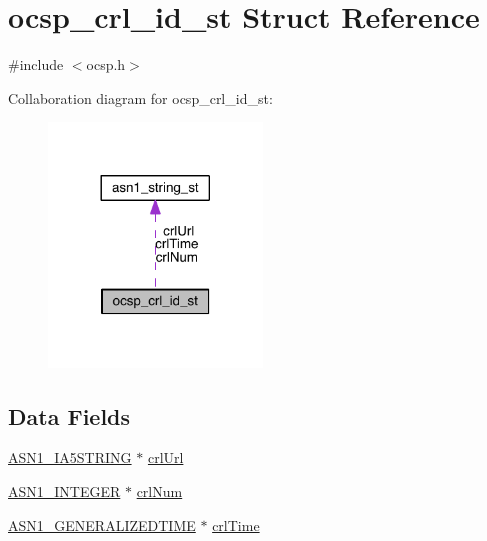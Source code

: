 \hypertarget{structocsp__crl__id__st}{}\section{ocsp\+\_\+crl\+\_\+id\+\_\+st Struct Reference}
\label{structocsp__crl__id__st}


{\ttfamily \#include $<$ocsp.\+h$>$}



Collaboration diagram for ocsp\+\_\+crl\+\_\+id\+\_\+st\+:\nopagebreak
\begin{figure}[H]
\begin{center}
\leavevmode
\includegraphics[width=161pt]{structocsp__crl__id__st__coll__graph}
\end{center}
\end{figure}
\subsection*{Data Fields}
\begin{DoxyCompactItemize}
\item 
\hyperlink{crypto_2ossl__typ_8h_a0d915c339a64c1c9871d5404e51c44fd}{A\+S\+N1\+\_\+\+I\+A5\+S\+T\+R\+I\+NG} $\ast$ \hyperlink{structocsp__crl__id__st_aa6926655bdd63112ca018d51fb103297}{crl\+Url}
\item 
\hyperlink{crypto_2ossl__typ_8h_af4335399bf9774cb410a5e93de65998b}{A\+S\+N1\+\_\+\+I\+N\+T\+E\+G\+ER} $\ast$ \hyperlink{structocsp__crl__id__st_ae6ffaabc958161934fbecacda433785e}{crl\+Num}
\item 
\hyperlink{crypto_2ossl__typ_8h_abd19ea5b527807ce3a516e6a41440f84}{A\+S\+N1\+\_\+\+G\+E\+N\+E\+R\+A\+L\+I\+Z\+E\+D\+T\+I\+ME} $\ast$ \hyperlink{structocsp__crl__id__st_a5072cce8653ccbb6ea9497d107636de8}{crl\+Time}
\end{DoxyCompactItemize}


